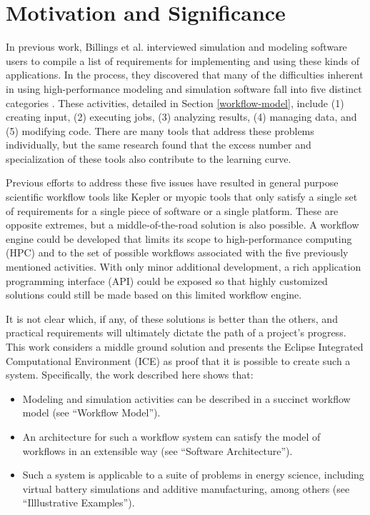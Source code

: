 \section{Motivation and Significance}\label{motivation-and-significance}

In previous work, Billings et al. interviewed simulation and modeling 
software users to compile a list of requirements for implementing and 
using these kinds of applications. In the process, they discovered 
that many of the difficulties inherent in using
high-performance modeling and simulation software fall into five
distinct categories \cite{billings_designing_2009}. These activities,
detailed in Section \ref{workflow-model}, include (1) creating input,
(2) executing jobs, (3) analyzing results, (4) managing data, and (5)
modifying code. There are many tools that address these problems
individually, but the same research found that the excess number and
specialization of these tools also contribute to the learning curve.

Previous efforts to address these five issues have resulted in general
purpose scientific workflow tools like Kepler \cite{ludascher_scientific_2006} 
or myopic tools that only satisfy a single
set of requirements for a single piece of software or a single platform. These
are opposite extremes, but a middle-of-the-road solution is also
possible. A workflow engine could be developed that limits its scope to
high-performance computing (HPC) and to the set of possible workflows
associated with the five previously mentioned activities. With only
minor additional development, a rich application programming interface
(API) could be exposed so that highly customized solutions could still
be made based on this limited workflow engine.

It is not clear which, if any, of these solutions is better than the
others, and practical requirements will ultimately dictate the path of a
project's progress. This work considers a middle ground solution and
presents the Eclipse Integrated Computational Environment (ICE) as proof
that it is possible to create such a system. Specifically, the work
described here shows that:

\begin{itemize}
\item
  Modeling and simulation activities can be described in a succinct
  workflow model (see ``Workflow Model'').
\item
  An architecture for such a workflow system can satisfy the model of
  workflows in an extensible way (see ``Software Architecture'').
\item
  Such a system is applicable to a suite of problems in energy science,
  including virtual battery simulations and additive manufacturing, 
  among others (see ``Illlustrative Examples'').
\end{itemize}

